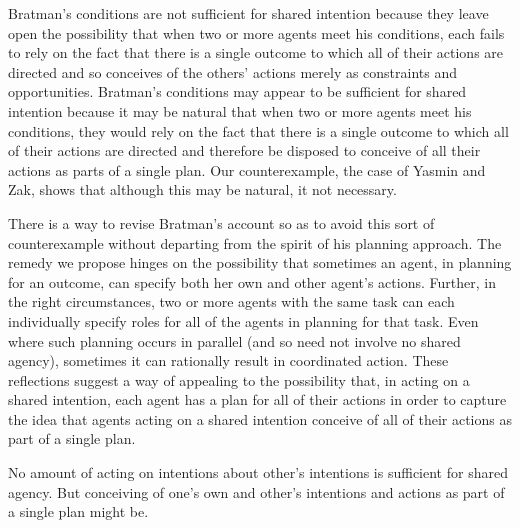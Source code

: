 \documentclass[12pt,\papersize]{extarticle}
\begin{document}
Bratman's conditions are not sufficient for shared intention because they leave open the possibility that  when two or more agents meet his conditions, each fails to rely on the fact that there is a single outcome to which all of their actions are directed and so conceives of the others' actions merely as constraints and opportunities.
Bratman's conditions may appear to be sufficient for shared intention because it may be natural that when two or more agents meet his conditions, they would rely on the fact that there is a single outcome to which all of their actions are directed and therefore be disposed to conceive of all their actions as parts of a single plan. 
Our counterexample, the case of Yasmin and Zak, shows that although this may be natural, it not necessary.

There is a way to revise Bratman's account so as to avoid this sort of counterexample without departing from the spirit of his planning approach.
The remedy we propose hinges on the possibility that sometimes an agent, in planning for an outcome, can specify both her own and other agent's actions.
Further, in the right circumstances,
two or more agents with the same task
	can each individually specify roles for all of the agents in planning for that task.
Even where such planning occurs in parallel (and so need not involve no shared agency), sometimes it can rationally result in coordinated action.
These reflections suggest a way of appealing to the possibility that, in acting on a shared intention, each agent has a plan for all of their actions
in order to capture the idea that agents acting on a shared intention conceive of all of their actions as part of a single plan.

No amount of acting on intentions about other's intentions is  sufficient for shared agency.  
But conceiving of one's own and other's intentions and actions as part of a single plan might be.



\end{document}
